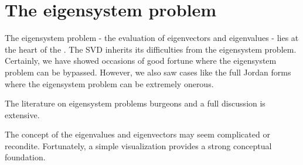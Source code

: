 \chapter{The eigensystem problem}

The eigensystem problem - the evaluation of eigenvectors and eigenvalues - lies at the heart of the \svdp. The SVD inherits its difficulties from the eigensystem problem. Certainly, we have showed occasions of good fortune where the eigensystem problem can be bypassed. However, we also saw cases like the full Jordan forms where the eigensystem problem can be extremely onerous.

The literature on eigensystem problems burgeons and a full discussion is extensive.

The concept of the eigenvalues and eigenvectors may seem complicated or recondite. Fortunately, a simple visualization provides a strong conceptual foundation.

\endinput